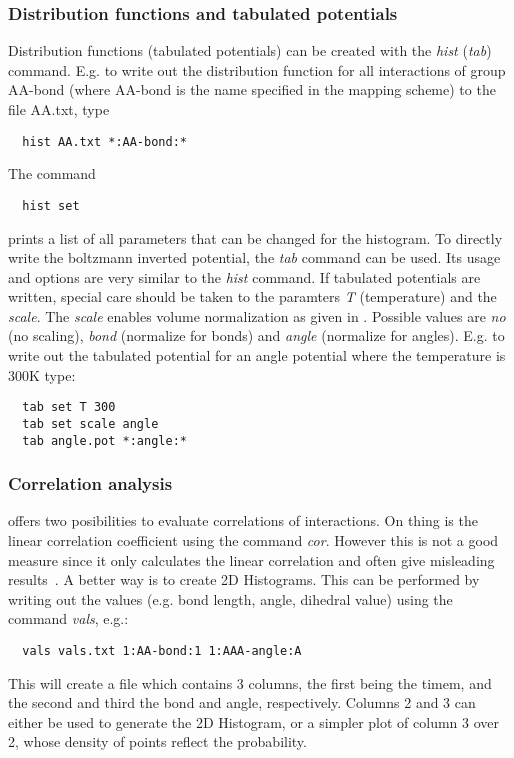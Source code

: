 \subsubsection{Distribution functions and tabulated potentials}
Distribution functions (tabulated potentials) can be created with the \textit{hist} (\textit{tab}) command.
E.g. to write out the distribution function for all interactions of group AA-bond (where AA-bond is the name specified in the mapping scheme) to the file AA.txt, type
\begin{verbatim}
  hist AA.txt *:AA-bond:*   
\end{verbatim}
The command
\begin{verbatim}
  hist set
\end{verbatim}
prints a list of all parameters that can be changed for the histogram. To directly write the boltzmann inverted potential, the \textit{tab} command can be used. Its usage and options are very similar to the \textit{hist} command. If tabulated potentials are written, special care should be taken to the paramters \textit{T} (temperature) and the \textit{scale}. The \textit{scale} enables volume normalization as given in . Possible values are \textit{no} (no scaling), \textit{bond} (normalize for bonds) and \textit{angle} (normalize for angles). E.g. to write out the tabulated potential for an angle potential where the temperature is 300K type:
\begin{verbatim}
  tab set T 300
  tab set scale angle
  tab angle.pot *:angle:*
\end{verbatim}

\subsubsection{Correlation analysis}
 offers two posibilities to evaluate correlations of interactions. On thing is the linear correlation coefficient using the command \textit{cor}. However this is not a good measure since it only calculates the linear correlation and often give misleading results~\cite{Ruehle:2009.a}. A better way is to create 2D Histograms. This can be performed by writing out the values (e.g. bond length, angle, dihedral value) using the command \textit{vals}, e.g.:
\begin{verbatim}
  vals vals.txt 1:AA-bond:1 1:AAA-angle:A
\end{verbatim}
This will create a file which contains 3 columns, the first being the timem, and the second and third the bond and angle, respectively. Columns 2 and 3 can either be used to generate the 2D Histogram, or a simpler plot of column 3 over 2, whose density of points reflect the probability.
